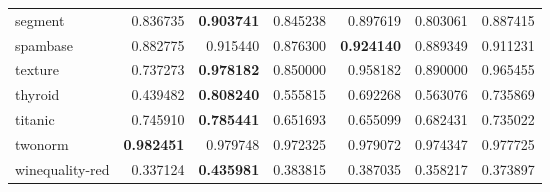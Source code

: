 \begin{tabular}{lrrrrrr}
segment         &         0.836735 &  \textbf{0.903741} &                  0.845238 &       0.897619 &                  0.803061 &       0.887415 \\
spambase        &         0.882775 &  0.915440 &                  0.876300 &       \textbf{0.924140} &                  0.889349 &       0.911231 \\
texture         &         0.737273 &  \textbf{0.978182} &                  0.850000 &       0.958182 &                  0.890000 &       0.965455 \\
thyroid         &         0.439482 &  \textbf{0.808240} &                  0.555815 &       0.692268 &                  0.563076 &       0.735869 \\
titanic         &         0.745910 &  \textbf{0.785441} &                  0.651693 &       0.655099 &                  0.682431 &       0.735022 \\
twonorm         &         \textbf{0.982451} &  0.979748 &                  0.972325 &       0.979072 &                  0.974347 &       0.977725 \\
winequality-red &         0.337124 &  \textbf{0.435981} &                  0.383815 &       0.387035 &                  0.358217 &       0.373897 \\
\bottomrule
\end{tabular}
